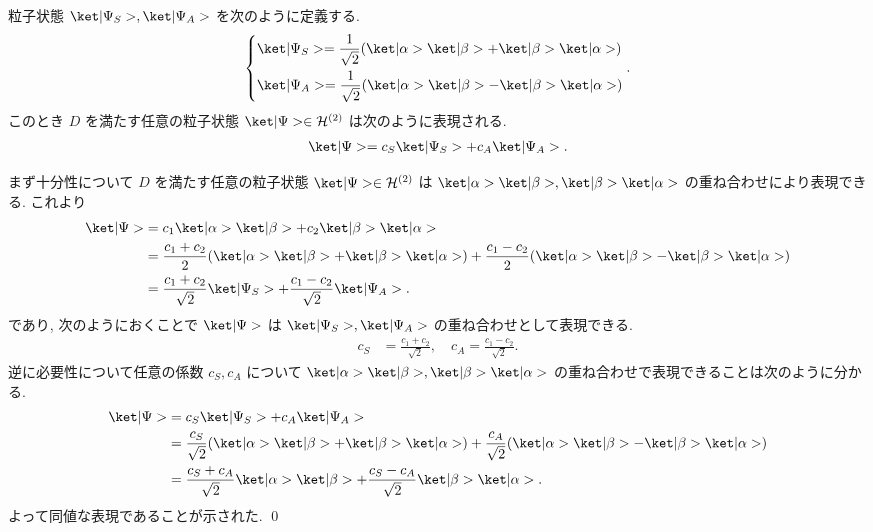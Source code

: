 \documentclass[uplatex,dvipdfmx,a4paper,11pt]{jlreq}
\makeatletter
\newcommand{\HH}{\mathcal{H}}
\numberwithin{equation}{section}
\theoremstyle{definition}
\renewenvironment{proof}[1][\proofname]{\par
  \normalfont
  \topsep6\p@\@plus6\p@ \trivlist
  \item[\hskip\labelsep{\bfseries #1}\@addpunct{\bfseries}]\ignorespaces\quad\par
}{%
  \qed\endtrivlist\@endpefalse
}
\renewcommand\proofname{証明}
\makeatother
\begin{document}
\begin{proposition}[Q21-1(ii)]
  粒子状態 $\ket|\Psi_S>, \ket|\Psi_A>$ を次のように定義する.
  \begin{align}
    \begin{dcases}
      \ket|\Psi_S> = \frac{1}{\sqrt{2}}(\ket|\alpha>\ket|\beta> + \ket|\beta>\ket|\alpha>) \\
      \ket|\Psi_A> = \frac{1}{\sqrt{2}}(\ket|\alpha>\ket|\beta> - \ket|\beta>\ket|\alpha>)
    \end{dcases}.
  \end{align}
  このとき $D$ を満たす任意の粒子状態 $\ket|\Psi>\in\HH^{(2)}$ は次のように表現される.
  \begin{align}
    \ket|\Psi> = c_S\ket|\Psi_S> + c_A\ket|\Psi_A>.
  \end{align}
\end{proposition}
\begin{proof}
  まず十分性について $D$ を満たす任意の粒子状態 $\ket|\Psi>\in\HH^{(2)}$ は $\ket|\alpha>\ket|\beta>, \ket|\beta>\ket|\alpha>$ の重ね合わせにより表現できる. これより
  \begin{align}
    \ket|\Psi> & = c_1\ket|\alpha>\ket|\beta> + c_2\ket|\beta>\ket|\alpha>                                                                                         \\
               & = \frac{c_1 + c_2}{2}(\ket|\alpha>\ket|\beta> + \ket|\beta>\ket|\alpha>) + \frac{c_1 - c_2}{2}(\ket|\alpha>\ket|\beta> - \ket|\beta>\ket|\alpha>) \\
               & = \frac{c_1 + c_2}{\sqrt{2}}\ket|\Psi_S> + \frac{c_1 - c_2}{\sqrt{2}}\ket|\Psi_A>.
  \end{align}
  であり, 次のようにおくことで $\ket|\Psi>$ は $\ket|\Psi_S>, \ket|\Psi_A>$ の重ね合わせとして表現できる.
  \begin{align}
    c_S & = \frac{c_1 + c_2}{\sqrt{2}}, \quad c_A = \frac{c_1 - c_2}{\sqrt{2}}.
  \end{align}
  逆に必要性について任意の係数 $c_S, c_A$ について $\ket|\alpha>\ket|\beta>, \ket|\beta>\ket|\alpha>$ の重ね合わせで表現できることは次のように分かる.
  \begin{align}
    \ket|\Psi> & = c_S\ket|\Psi_S> + c_A\ket|\Psi_A>                                                                                                                 \\
               & = \frac{c_S}{\sqrt{2}}(\ket|\alpha>\ket|\beta> + \ket|\beta>\ket|\alpha>) + \frac{c_A}{\sqrt{2}}(\ket|\alpha>\ket|\beta> - \ket|\beta>\ket|\alpha>) \\
               & = \frac{c_S + c_A}{\sqrt{2}}\ket|\alpha>\ket|\beta> + \frac{c_S - c_A}{\sqrt{2}}\ket|\beta>\ket|\alpha>.
  \end{align}
  よって同値な表現であることが示された.
\end{proof}
\end{document}
